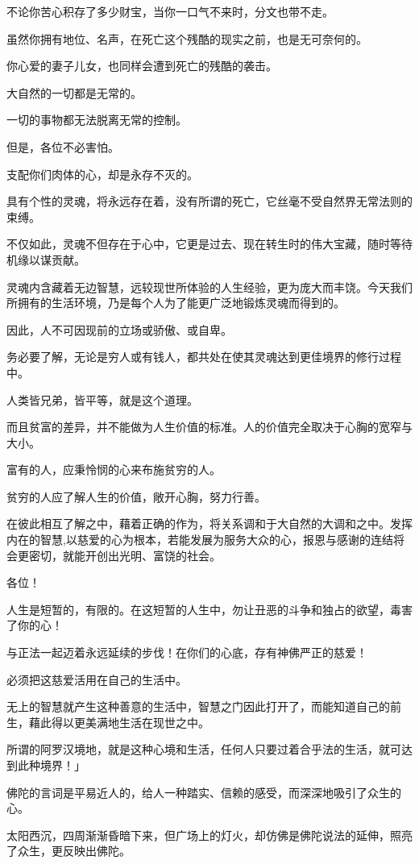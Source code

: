 \documentclass[twoside,openany]{book}
\begin{document}
不论你苦心积存了多少财宝，当你一口气不来时，分文也带不走。

虽然你拥有地位、名声，在死亡这个残酷的现实之前，也是无可奈何的。

你心爱的妻子儿女，也同样会遭到死亡的残酷的袭击。

大自然的一切都是无常的。

一切的事物都无法脱离无常的控制。

但是，各位不必害怕。

支配你们肉体的心，却是永存不灭的。

具有个性的灵魂，将永远存在着，没有所谓的死亡，它丝毫不受自然界无常法则的束缚。

不仅如此，灵魂不但存在于心中，它更是过去、现在转生时的伟大宝藏，随时等待机缘以谋贡献。

灵魂内含藏着无边智慧，远较现世所体验的人生经验，更为庞大而丰饶。今天我们所拥有的生活环境，乃是每个人为了能更广泛地锻炼灵魂而得到的。

因此，人不可因现前的立场或骄傲、或自卑。

务必要了解，无论是穷人或有钱人，都共处在使其灵魂达到更佳境界的修行过程中。

人类皆兄弟，皆平等，就是这个道理。

而且贫富的差异，并不能做为人生价值的标准。人的价值完全取决于心胸的宽窄与大小。

富有的人，应秉怜悯的心来布施贫穷的人。

贫穷的人应了解人生的价值，敞开心胸，努力行善。

在彼此相互了解之中，藉着正确的作为，将关系调和于大自然的大调和之中。发挥内在的智慧,以慈爱的心为根本，若能发展为服务大众的心，报恩与感谢的连结将会更密切，就能开创出光明、富饶的社会。

各位！

人生是短暂的，有限的。在这短暂的人生中，勿让丑恶的斗争和独占的欲望，毒害了你的心！

与正法一起迈着永远延续的步伐！在你们的心底，存有神佛严正的慈爱！

必须把这慈爱活用在自己的生活中。

无上的智慧就产生这种善意的生活中，智慧之门因此打开了，而能知道自己的前生，藉此得以更美满地生活在现世之中。

所谓的阿罗汉境地，就是这种心境和生活，任何人只要过着合乎法的生活，就可达到此种境界！」

佛陀的言词是平易近人的，给人一种踏实、信赖的感受，而深深地吸引了众生的心。

太阳西沉，四周渐渐昏暗下来，但广场上的灯火，却仿佛是佛陀说法的延伸，照亮了众生，更反映出佛陀。
\end{document}
